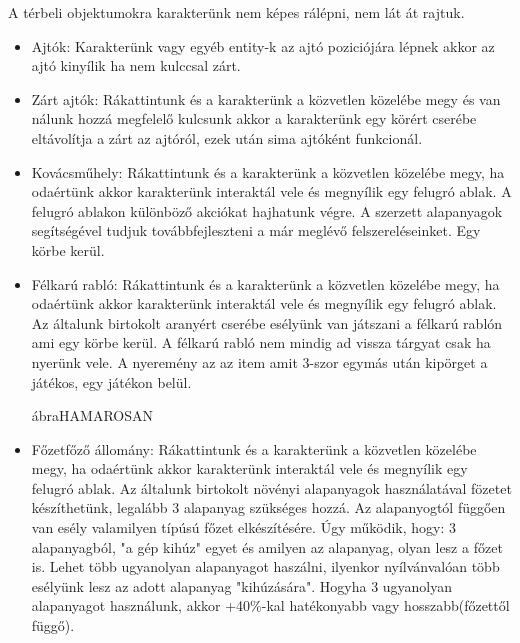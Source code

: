 
A térbeli objektumokra karakterünk nem képes rálépni, nem lát át rajtuk.
\begin{itemize}
\item
Ajtók: Karakterünk vagy egyéb entity-k az ajtó poziciójára lépnek akkor az ajtó kinyílik ha nem kulccsal zárt.
\item
Zárt ajtók: Rákattintunk és a karakterünk a közvetlen közelébe megy és van nálunk hozzá megfelelő kulcsunk akkor a karakterünk egy körért cserébe eltávolítja a zárt az ajtóról, ezek után sima ajtóként funkcionál.
\item
Kovácsműhely: Rákattintunk és a karakterünk a közvetlen közelébe megy, ha odaértünk akkor karakterünk interaktál vele és megnyílik egy felugró ablak. A felugró ablakon különböző akciókat hajhatunk végre. A szerzett alapanyagok segítségével tudjuk továbbfejleszteni a már meglévő felszereléseinket. Egy körbe kerül.


\item
Félkarú rabló: Rákattintunk és a karakterünk a közvetlen közelébe megy, ha odaértünk akkor karakterünk interaktál vele és megnyílik egy felugró ablak. Az általunk birtokolt aranyért cserébe esélyünk van játszani a félkarú rablón ami egy körbe kerül. A félkarú rabló nem mindig ad vissza tárgyat csak ha nyerünk vele. A nyeremény az az item amit 3-szor egymás után kipörget a játékos, egy játékon belül.


ábra{HAMAROSAN}


\item
Főzetfőző állomány: Rákattintunk és a karakterünk a közvetlen közelébe megy, ha odaértünk akkor karakterünk interaktál vele és megnyílik egy felugró ablak. Az általunk birtokolt növényi alapanyagok használatával fözetet készíthetünk, legalább 3 alapanyag szükséges hozzá. Az alapanyogtól függően van esély valamilyen típúsú főzet elkészítésére. Úgy működik, hogy: 3 alapanyagból, "a gép kihúz" egyet és amilyen az alapanyag, olyan lesz a főzet is. Lehet több ugyanolyan alapanyagot haszálni, ilyenkor nyílvánvalóan több esélyünk lesz az adott alapanyag "kihúzására". Hogyha 3 ugyanolyan alapanyagot használunk, akkor +40\%-kal hatékonyabb vagy hosszabb(főzettől függő).


\end{itemize}
